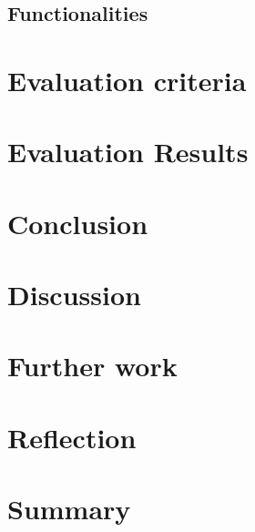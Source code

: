\subsection{Functionalities}
\section{Evaluation criteria}
\section{Evaluation Results}
\section{Conclusion}
\section{Discussion}
\section{Further work}
\section{Reflection}
\section{Summary}